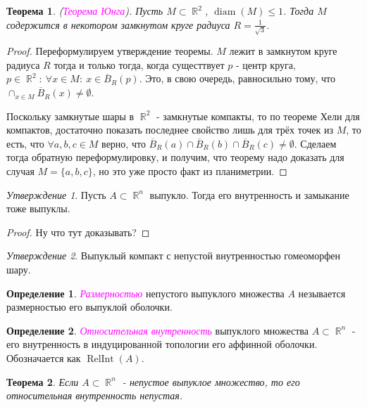 \documentclass[a4paper,100pt]{article}
\theoremstyle{indented}
\newtheorem{theorem}{Теорема}
\theoremstyle{definition}
\newtheorem{defn}{Определение}
\theoremstyle{remark}
\newtheorem{stat}{Утверждение}
\DeclareMathOperator{\diam}{diam}
\DeclareMathOperator{\RelInt}{RelInt}
\DeclareMathOperator{\RR}{\mathbb{R}}
\begin{document}
\begin{theorem}
    (\textit{\textcolor{magenta}{\hypertarget{s95}{Теорема Юнга}}}). Пусть $M \subset \RR^2$, $\diam (M) \leq 1$. Тогда $M$ содержится в некотором замкнутом круге радиуса $R=\frac{1}{\sqrt{3}}$. 
\end{theorem}

\begin{proof}
    Переформулируем утверждение теоремы. $M$ лежит в замкнутом круге радиуса $R$ тогда и только тогда, когда сущесттвует $p$ - центр круга, $p \in \RR^2: \: \forall x \in M: \: x \in \overline{B}_R(p)$. Это, в свою очередь, равносильно тому, что $\cap_{x \in M} \overline{B}_R(x) \neq \emptyset$. \ 

    Поскольку замкнутые шары в $\RR^2$ - замкнутые компакты, то по теореме Хели для компактов, достаточно показать последнее свойство лишь для трёх точек из $M$, то есть, что $\forall a, b, c \in M$ верно, что $\overline{B}_R(a) \cap \overline{B}_R(b) \cap \overline{B}_R(c) \neq \emptyset$. Сделаем тогда обратную переформулировку, и получим, что теорему надо доказать для случая $M = \{a, b, c\}$, но это уже просто факт из планиметрии.
\end{proof}

\begin{stat}
    Пусть $A \subset \RR^n$ выпукло. Тогда его внутренность и замыкание тоже выпуклы.
\end{stat}

\begin{proof}
    Ну что тут доказывать?    
\end{proof}

\begin{stat}
    Выпуклый компакт с непустой внутренностью гомеоморфен шару.
\end{stat}

\begin{defn}
    \textit{\textcolor{magenta}{\hypertarget{s96}{Размерностью}}} непустого выпуклого множества $A$ незывается размерностью его выпуклой оболочки.
\end{defn}

\begin{defn}
    \textit{\textcolor{magenta}{\hypertarget{s97}{Относительная внутренность}}} выпуклого множества $A \subset \RR^n$ - его внутренность в индуцированной топологии его аффинной оболочки. Обозначается как $\RelInt(A)$. 
\end{defn}

\begin{theorem}
    Если $A \subset \RR^n$ - непустое выпуклое множество, то его относительная внутренность непустая.
\end{theorem}
\end{document}
